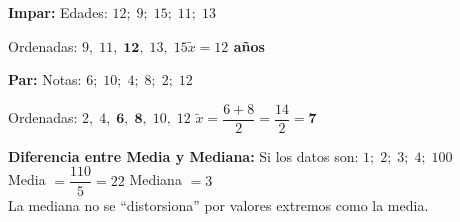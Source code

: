 \documentclass[12pt, letterpaper]{article}
\begin{document}
	\begin{ejemplo}
		\textbf{Impar:} Edades: $12;\;9;\;15;\;11;\;13$
		
		Ordenadas: $9,\;11,\;\mathbf{12},\;13,\;15$\quad \textbf{$\tilde{x}=12$ años}
		
		\vspace{0.3cm}
		\textbf{Par:} Notas: $6;\;10;\;4;\;8;\;2;\;12$
		
		Ordenadas: $2,\;4,\;\mathbf{6,\;8},\;10,\;12$\quad
		$\tilde{x}=\dfrac{6+8}{2}=\dfrac{14}{2}=\mathbf{7}$
		
		\vspace{0.3cm}
		\textbf{Diferencia entre Media y Mediana:}
		Si los datos son: $1;\;2;\;3;\;4;\;100$\\
		Media $= \dfrac{110}{5}=22$ \quad Mediana $= 3$\\
		La mediana no se ``distorsiona'' por valores extremos como la media.
	\end{ejemplo}
	\newpage
\end{document}
